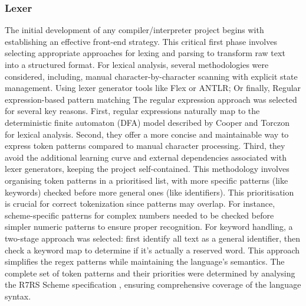 \documentclass[final]{cmpreport_02}
\begin{document}
\subsubsection{Lexer}
The initial development of any compiler/interpreter project begins with establishing an effective front-end strategy. This critical first phase involves selecting appropriate approaches for lexing and parsing to transform raw text into a structured format.
For lexical analysis, several methodologies were considered, including, manual character-by-character scanning with explicit state management. Using lexer generator tools like Flex or ANTLR; Or finally, Regular expression-based pattern matching
The regular expression approach was selected for several key reasons. 
First, regular expressions naturally map to the deterministic finite automaton (DFA) model described by Cooper and Torczon \cite{cooper2011engineering} for lexical analysis. Second, they offer a more concise and maintainable way to express token patterns compared to manual character processing. Third, they avoid the additional learning curve and external dependencies associated with lexer generators, keeping the project self-contained.
This methodology involves organising token patterns in a prioritised list, with more specific patterns (like keywords) checked before more general ones (like identifiers). This prioritisation is crucial for correct tokenization since patterns may overlap. For instance, scheme-specific patterns for complex numbers needed to be checked before simpler numeric patterns to ensure proper recognition.
For keyword handling, a two-stage approach was selected: first identify all text as a general identifier, then check a keyword map to determine if it's actually a reserved word. This approach simplifies the regex patterns while maintaining the language's semantics.
The complete set of token patterns and their priorities were determined by analysing the R7RS Scheme specification \cite{r7rs}, ensuring comprehensive coverage of the language syntax.
\end{document}
